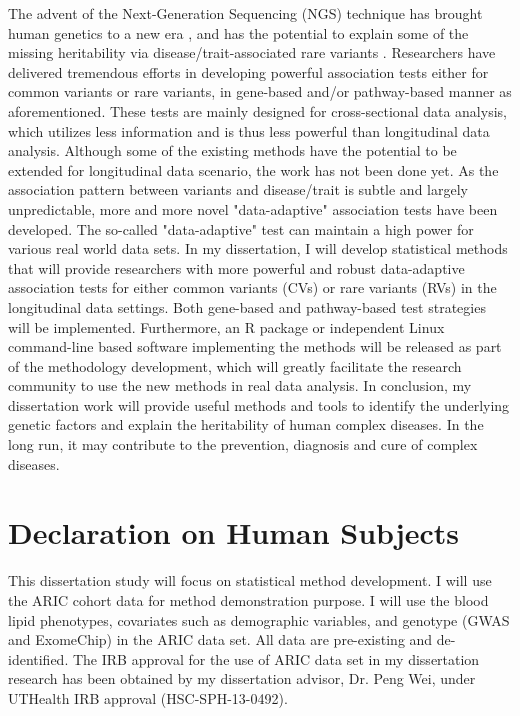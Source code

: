 \documentclass[12pt]{article}
\begin{document}
The advent of the Next-Generation Sequencing (NGS) technique has brought human genetics to a new era \cite{Ansorge2009,Metzker2009,Mardis2008,Shendure2008}, and has the potential to explain some of the missing heritability via disease/trait-associated rare variants \cite{Eichler2010}. Researchers have delivered tremendous efforts in developing powerful association tests either for common variants or rare variants, in gene-based and/or pathway-based manner as aforementioned. These tests are mainly designed for cross-sectional data analysis, which utilizes less information and is thus less powerful than longitudinal data analysis. Although some of the existing methods have the potential to be extended for longitudinal data scenario, the work has not been done yet.
As the association pattern between variants and disease/trait is subtle and largely unpredictable, more and more novel "data-adaptive" association tests have been developed. The so-called "data-adaptive" test can maintain a high power for various real world data sets. In my dissertation, I will develop statistical methods that will provide researchers with more powerful and robust data-adaptive association tests for either common variants (CVs) or rare variants (RVs) in the longitudinal data settings. Both gene-based and pathway-based test strategies will be implemented. Furthermore, an R package or independent Linux command-line based software implementing the methods will be released as part of the methodology development, which will greatly facilitate the research community to use the new methods in real data analysis. In conclusion, my dissertation work will provide useful methods and tools to identify the underlying genetic factors and explain the heritability of human complex diseases. In the long run, it may contribute to the prevention, diagnosis and cure of complex diseases.

\section{Declaration on Human Subjects}
This dissertation study will focus on statistical method development. I will use the ARIC cohort data for method demonstration purpose. I will use the blood lipid phenotypes, covariates such as demographic variables, and genotype (GWAS and ExomeChip) in the ARIC data set. All data are pre-existing and de-identified. The IRB approval for the use of ARIC data set in my dissertation research has been obtained by my dissertation advisor, Dr. Peng Wei, under UTHealth IRB approval (HSC-SPH-13-0492).
\end{document}
